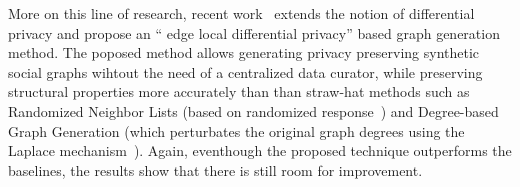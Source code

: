 More on this line of research, recent work~\cite{qin2017generating} extends the notion of differential privacy
and propose an `` edge local differential privacy'' based graph generation
method. The poposed method allows generating privacy preserving synthetic social
graphs wihtout the need of a centralized data curator, while preserving structural
properties more accurately than than straw-hat methods such as Randomized
Neighbor Lists (based on randomized response~\cite{dwork2014algorithmic}) and
Degree-based Graph Generation (which perturbates the original graph degrees
using the Laplace mechanism~\cite{dwork2009differential}). Again, eventhough the
proposed technique outperforms the baselines, the results show that there is
still room for improvement.
